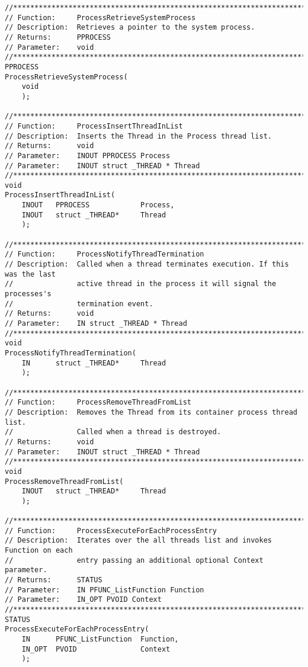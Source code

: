 \begin{appendices}
\begin{lstlisting}[caption={Process Private Interface},label={lst:ProcPrivate}]
//******************************************************************************
// Function:     ProcessRetrieveSystemProcess
// Description:  Retrieves a pointer to the system process.
// Returns:      PPROCESS
// Parameter:    void
//******************************************************************************
PPROCESS
ProcessRetrieveSystemProcess(
    void
    );

//******************************************************************************
// Function:     ProcessInsertThreadInList
// Description:  Inserts the Thread in the Process thread list.
// Returns:      void
// Parameter:    INOUT PPROCESS Process
// Parameter:    INOUT struct _THREAD * Thread
//******************************************************************************
void
ProcessInsertThreadInList(
    INOUT   PPROCESS            Process,
    INOUT   struct _THREAD*     Thread
    );

//******************************************************************************
// Function:     ProcessNotifyThreadTermination
// Description:  Called when a thread terminates execution. If this was the last
//               active thread in the process it will signal the processes's
//               termination event.
// Returns:      void
// Parameter:    IN struct _THREAD * Thread
//******************************************************************************
void
ProcessNotifyThreadTermination(
    IN      struct _THREAD*     Thread
    );

//******************************************************************************
// Function:     ProcessRemoveThreadFromList
// Description:  Removes the Thread from its container process thread list.
//               Called when a thread is destroyed.
// Returns:      void
// Parameter:    INOUT struct _THREAD * Thread
//******************************************************************************
void
ProcessRemoveThreadFromList(
    INOUT   struct _THREAD*     Thread
    );

//******************************************************************************
// Function:     ProcessExecuteForEachProcessEntry
// Description:  Iterates over the all threads list and invokes Function on each
//               entry passing an additional optional Context parameter.
// Returns:      STATUS
// Parameter:    IN PFUNC_ListFunction Function
// Parameter:    IN_OPT PVOID Context
//******************************************************************************
STATUS
ProcessExecuteForEachProcessEntry(
    IN      PFUNC_ListFunction  Function,
    IN_OPT  PVOID               Context
    );


\end{lstlisting}
\end{appendices}
